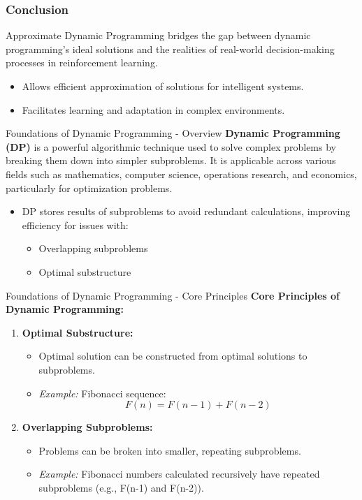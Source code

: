 \documentclass[aspectratio=169]{beamer}
\begin{document}
\begin{frame}[fragile]
    \frametitle{Conclusion}
    Approximate Dynamic Programming bridges the gap between dynamic programming's ideal solutions and the realities of real-world decision-making processes in reinforcement learning. 

    \begin{itemize}
        \item Allows efficient approximation of solutions for intelligent systems.
        \item Facilitates learning and adaptation in complex environments.
    \end{itemize}
\end{frame}

\begin{frame}[fragile]{Foundations of Dynamic Programming - Overview}
    \textbf{Dynamic Programming (DP)} is a powerful algorithmic technique used to solve complex problems by breaking them down into simpler subproblems. It is applicable across various fields such as mathematics, computer science, operations research, and economics, particularly for optimization problems. 
    \begin{itemize}
        \item DP stores results of subproblems to avoid redundant calculations, improving efficiency for issues with:
        \begin{itemize}
            \item Overlapping subproblems
            \item Optimal substructure
        \end{itemize}
    \end{itemize}
\end{frame}

\begin{frame}[fragile]{Foundations of Dynamic Programming - Core Principles}
    \textbf{Core Principles of Dynamic Programming:}
    \begin{enumerate}
        \item \textbf{Optimal Substructure:}
        \begin{itemize}
            \item Optimal solution can be constructed from optimal solutions to subproblems.
            \item \textit{Example:} Fibonacci sequence: 
            \[
            F(n) = F(n-1) + F(n-2)
            \]
        \end{itemize}
        
        \item \textbf{Overlapping Subproblems:}
        \begin{itemize}
            \item Problems can be broken into smaller, repeating subproblems.
            \item \textit{Example:} Fibonacci numbers calculated recursively have repeated subproblems (e.g., F(n-1) and F(n-2)).
        \end{itemize}
    \end{enumerate}
\end{frame}
\end{document}
